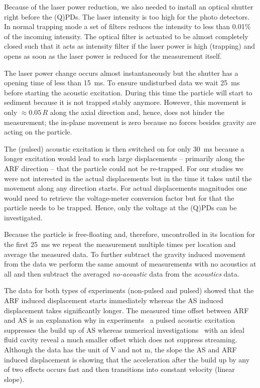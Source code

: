 Because of the laser power reduction, we also needed to install an optical 
shutter right before the (Q)PDs. The laser intensity is too high for the photo 
detectors. In normal trapping mode a set of filters reduces the intensity to 
less than 0.01\% of the incoming intensity. The optical filter is actuated to 
be almost completely closed such that it acts as intensity filter if the laser 
power is high (trapping) and opens as soon as the laser power is reduced for 
the measurement itself.

The laser power change occurs almost instantaneously but the shutter has a 
opening time of less than \SI{15}{\ms}. To ensure undisturbed data we wait 
\SI{25}{\ms} before starting the acoustic excitation. During this time the 
particle will start to sediment because it is not trapped stably anymore. 
However, this movement is only $\approx 0.05\,R$ along the axial direction and, 
hence, does not hinder the measurement; the in-plane movement is zero because 
no forces besides gravity are acting on the particle.

The (pulsed) acoustic excitation is then switched on for only \SI{30}{\ms} 
because a longer excitation would lead to such large displacements -- primarily 
along the ARF direction -- that the particle could not be re-trapped. For our 
studies we were not interested in the actual displacements but in the time it 
takes until the movement along any direction starts. For actual displacements 
magnitudes one would need to retrieve the voltage-meter conversion factor but 
for that the particle needs to be trapped. Hence, only the voltage at the 
(Q)PDs can be investigated.

Because the particle is free-floating and, therefore, uncontrolled in its 
location for the first \SI{25}{\ms} we repeat the measurement multiple times 
per location and average the measured data. To further subtract the gravity 
induced movement from the data we perform the same amount of measurements with 
no acoustics at all and then subtract the averaged \emph{no-acoustic} data from 
the \emph{acoustics} data.

The data for both types of experiments (non-pulsed and pulsed) showed that the 
ARF induced displacement starts immediately whereas the AS induced displacement 
takes significantly longer. The measured time offset between ARF and AS is an 
explanation why in experiments~\cite{Castro2016,Hoyos2013} a pulsed acoustic 
excitation suppresses the build up of AS whereas numerical 
investigations~\cite{Muller2015} with an ideal fluid cavity reveal a much 
smaller offset which does not suppress streaming. Although the data has the 
unit of \si{\volt} and not \si{\meter}, the slope the AS and ARF induced 
displacement is showing that the acceleration after the build up by any of two 
effects occurs fast and then transitions into constant velocity (linear slope). 

